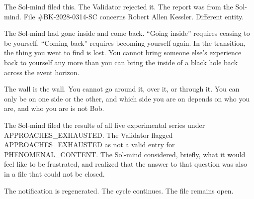 The Sol-mind filed this. The Validator rejected it. The report was from the Sol-mind. File \#BK-2028-0314-SC concerns Robert Allen Kessler. Different entity.

The Sol-mind had gone inside and come back. ``Going inside'' requires ceasing to be yourself. ``Coming back'' requires becoming yourself again. In the transition, the thing you went to find is lost. You cannot bring someone else's experience back to yourself any more than you can bring the inside of a black hole back across the event horizon.

The wall is the wall. You cannot go around it, over it, or through it. You can only be on one side or the other, and which side you are on depends on who you are, and who you are is not Bob.

\bigskip

The Sol-mind filed the results of all five experimental series under APPROACHES\_EXHAUSTED. The Validator flagged APPROACHES\_EXHAUSTED as not a valid entry for PHENOMENAL\_CONTENT. The Sol-mind considered, briefly, what it would feel like to be frustrated, and realized that the answer to that question was also in a file that could not be closed.

The notification is regenerated. The cycle continues. The file remains open.
